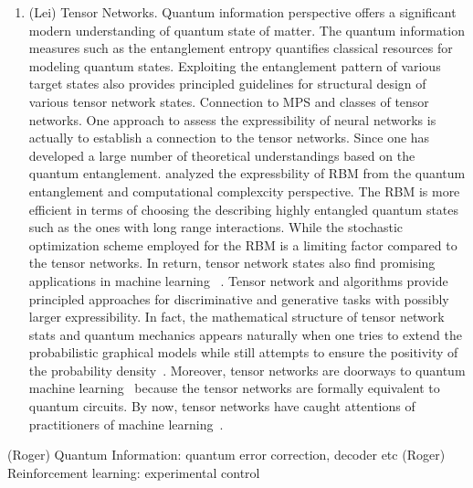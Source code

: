 \documentclass[aps,prb,floatfix,amsmath,amssymb,amsfonts,10pt,floatfix,longbibliography]{revtex4-1}
\begin{document}
\begin{enumerate}
\begin{enumerate}
	\item (Lei) Tensor Networks. 
Quantum information perspective offers a significant modern understanding of quantum state of matter. The quantum information measures such as the entanglement entropy quantifies classical resources for modeling quantum states. Exploiting the entanglement pattern of various target states also provides principled guidelines for structural design of various tensor network states. 
Connection to MPS and classes of tensor networks. One approach to assess the expressibility of neural networks is actually to establish a connection to the tensor networks. Since one has developed a large number of theoretical understandings based on the quantum entanglement. \cite{Chen, Gao, Deng} analyzed the expressbility of RBM from the quantum entanglement and computational complexcity perspective. The RBM is more efficient in terms of choosing the describing highly entangled quantum states such as the ones with long range interactions. While the stochastic optimization scheme employed for the RBM is a limiting factor compared to the tensor networks.  
In return, tensor network states also find promising applications in machine learning~ \cite{Stoudenmire}. Tensor network and algorithms provide principled approaches for discriminative and generative tasks with possibly larger expressibility. In fact, the mathematical structure of tensor network stats and quantum mechanics appears naturally when one tries to extend the probabilistic graphical models while still attempts to ensure the positivity of the probability density~\cite{pmlr-v20-bailly11, Zhao-Jaeger}. Moreover, tensor networks are doorways to quantum machine learning~\cite{QMLNature} because the tensor networks are formally equivalent to quantum circuits. By now, tensor networks have caught attentions of practitioners of machine learning~\cite{Levine2017,Cichocki2017}. 
\end{enumerate}
	
	
	
(Roger) Quantum Information: quantum error correction, decoder etc 
(Roger) Reinforcement learning: experimental control 


\end{enumerate}
\end{document}
